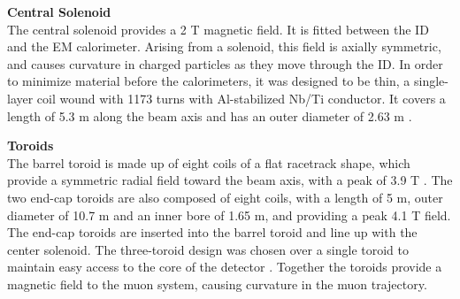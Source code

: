 \noindent\textbf{Central Solenoid}\\
\indent The central solenoid provides a 2 T magnetic field. It is fitted between the \gls{ID} and the \gls{EM} calorimeter. Arising from a solenoid, this field is axially symmetric, and causes curvature in charged particles as they move through the \gls{ID}. In order to minimize material before the calorimeters, it was designed to be thin, a single-layer coil wound with 1173 turns with Al-stabilized Nb/Ti conductor. It covers a length of 5.3 m along the beam axis and has an outer diameter of 2.63 m \cite{central-solenoid}.

\noindent\textbf{Toroids}\\
\indent The barrel toroid is made up of eight coils of a flat racetrack shape, which provide a symmetric radial field toward the beam axis, with a peak of 3.9 T \cite{barrel-toroid}. The two end-cap toroids are also composed of eight coils, with a length of 5 m, outer diameter of 10.7 m and an inner bore of 1.65 m, and providing a peak 4.1 T field. The end-cap toroids are inserted into the barrel toroid and line up with the center solenoid. The three-toroid design was chosen over a single toroid to maintain easy access to the core of the detector \cite{endcap-toroid}. Together the toroids provide a magnetic field to the muon system, causing curvature in the muon trajectory.


